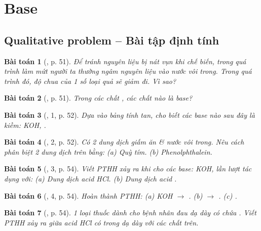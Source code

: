 \documentclass{article}
\newtheorem{baitoan}{Bài toán}
\begin{document}

\section{Base}

\subsection{Qualitative problem -- Bài tập định tính}

\begin{baitoan}[\cite{SGK_KHTN_8_Canh_Dieu}, p. 51]
	Để tránh nguyên liệu bị nát vụn khi chế biến, trong quá trình làm mứt người ta thường ngâm nguyên liệu vào nước vôi trong. Trong quá trình đó, độ chua của 1 số loại quả sẽ giảm đi. Vì sao?
\end{baitoan}

\begin{baitoan}[\cite{SGK_KHTN_8_Canh_Dieu}, p. 51]
	Trong các chất \emph{}, các chất nào là base?
\end{baitoan}

\begin{baitoan}[\cite{SGK_KHTN_8_Canh_Dieu}, 1, p. 52]
	Dựa vào bảng tính tan, cho biết các base nào sau đây là kiềm: \emph{KOH, }.
\end{baitoan}

\begin{baitoan}[\cite{SGK_KHTN_8_Canh_Dieu}, 2, p. 52]
	Có 2 dung dịch giấm ăn \& nước vôi trong. Nêu cách phân biệt 2 dung dịch trên bằng: (a) Quỳ tím. (b) Phenolphthalein.
\end{baitoan}

\begin{baitoan}[\cite{SGK_KHTN_8_Canh_Dieu}, 3, p. 54]
	Viết PTHH xảy ra khi cho các base: \emph{KOH, } lần lượt tác dụng với: (a) Dung dịch acid \emph{HCl}. (b) Dung dịch acid \emph{}.
\end{baitoan}

\begin{baitoan}[\cite{SGK_KHTN_8_Canh_Dieu}, 4, p. 54]
	Hoàn thành PTHH: (a) \emph{KOH $\to$ }. (b) \emph{ $\to$ }. (c) \emph{}.
\end{baitoan}

\begin{baitoan}[\cite{SGK_KHTN_8_Canh_Dieu}, p. 54]
	1 loại thuốc dành cho bệnh nhân đau dạ dày có chứa \emph{}. Viết PTHH xảy ra giữa acid \emph{HCl} có trong dạ dày với các chất trên.
\end{baitoan}
\end{document}
